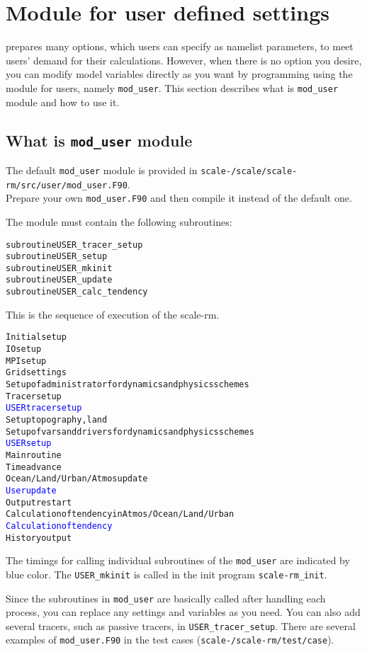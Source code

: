 \section{Module for user defined settings} \label{sec:mod_user}

\scalerm prepares many options, which users can specify as namelist parameters, to meet users' demand for their calculations.
However, when there is no option you desire,
you can modify model variables directly as you want by programming using the module for users, namely \verb|mod_user|.
This section describes what is \verb|mod_user| module and how to use it.


\subsection{What is \texttt{mod\_user} module}

The default \verb|mod_user| module is provided in \texttt{scale-{\version}/scale/scale-rm/src/user/mod\_user.F90}.\\
Prepare your own \verb|mod_user.F90| and then compile it instead of the default one.

The module must contain the following subroutines:
\begin{alltt}
  subroutine USER_tracer_setup
  subroutine USER_setup
  subroutine USER_mkinit
  subroutine USER_update
  subroutine USER_calc_tendency
\end{alltt}

\noindent This is the sequence of execution of the scale-rm.
\begin{alltt}
Initial setup
  IO setup
  MPI setup
  Grid settings
  Setup of administrator for dynamics and physics schemes 
  Tracer setup
  \textcolor{blue}{USER tracer setup}
  Setup topography, land
  Setup of vars and drivers for dynamics and physics schemes 
  \textcolor{blue}{USER setup}
Main routine
  Time advance
  Ocean/Land/Urban/Atmos update
  \textcolor{blue}{User update}
  Output restart
  Calculation of tendency in Atmos/Ocean/Land/Urban
  \textcolor{blue}{Calculation of tendency}
  History output
\end{alltt}
The timings for calling individual subroutines of the \verb|mod_user| are indicated by blue color.
The \verb|USER_mkinit| is called in the init program \verb|scale-rm_init|.


Since the subroutines in \verb|mod_user| are basically called after handling each process,
you can replace any settings and variables as you need.
You can also add several tracers, such as passive tracers, in \verb|USER_tracer_setup|.
There are several examples of \verb|mod_user.F90| in the test cases (\texttt{scale-{\version}/scale-rm/test/case}).
